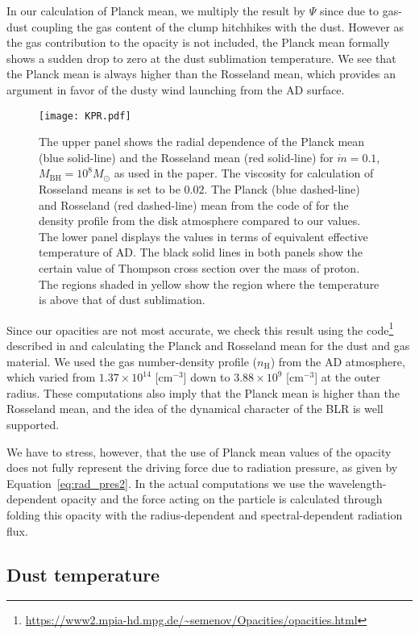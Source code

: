 \documentclass[twocolumn]{aastex62}
\begin{document}
In our calculation of Planck mean, we multiply the result by $\Psi$ since due to gas-dust coupling the gas content of the clump hitchhikes with the dust. However as the gas contribution to the opacity is not included, the Planck mean formally shows a sudden drop to zero at the dust sublimation temperature. We see that the Planck mean is always higher than the Rosseland mean, which provides an argument in favor of the dusty wind launching from the AD surface.

\begin{figure}[b]
	\centering
	\texttt{[image: KPR.pdf]}
	\caption{The upper panel shows the radial dependence of the Planck mean (blue solid-line) and the Rosseland mean (red solid-line) for $\dot m = 0.1$, $M_{\mathrm{BH}} = 10^8 M_{\odot}$ as used in the paper. The viscosity for calculation of Rosseland means is set to be $0.02$. The Planck (blue dashed-line) and Rosseland (red dashed-line) mean from the code of \citet{Semenov2003} for the density profile from the disk atmosphere compared to our values. The lower panel displays the values in terms of equivalent effective temperature of AD. The black solid lines in both panels show the certain value of Thompson cross section over the mass of proton. The regions shaded in yellow show the region where the temperature is above that of dust sublimation.}
	\label{fig:opacity}
\end{figure}

Since our opacities are not most accurate, we check this result using the code\footnote{\url{https://www2.mpia-hd.mpg.de/~semenov/Opacities/opacities.html}} described in \citet{Semenov2003} and calculating the Planck and Rosseland mean for the dust and gas material. We used the gas number-density profile ($n_{\mathrm{H}}$) from the AD atmosphere, which varied from $1.37 \times 10^{14}$ [cm$^{-3}$] down to $3.88 \times 10^{9}$ [cm$^{-3}$] at the outer radius. These computations also imply that the Planck mean is higher than the Rosseland mean, and the idea of the dynamical character of the BLR is well supported.

We have to stress, however, that the use of Planck mean values of the opacity does not fully represent the driving force due to radiation pressure, as given by Equation~\ref{eq:rad_pres2}. In the actual computations we use the wavelength-dependent opacity and the force acting on the particle is calculated through folding this opacity with the radius-dependent and spectral-dependent radiation flux.

\subsection{Dust temperature}\label{sec:dustsublimation}
\end{document}
